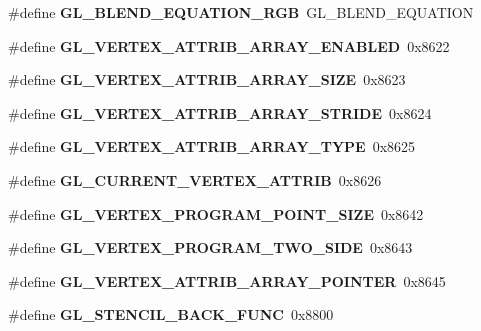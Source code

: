 \begin{DoxyCompactItemize}
\item 
\#define {\bfseries G\+L\+\_\+\+B\+L\+E\+N\+D\+\_\+\+E\+Q\+U\+A\+T\+I\+O\+N\+\_\+\+R\+G\+B}~G\+L\+\_\+\+B\+L\+E\+N\+D\+\_\+\+E\+Q\+U\+A\+T\+I\+O\+N\label{_s_d_l__opengl_8h_a2d24de280ec5f40a3c9e42f488ba0236}

\item 
\#define {\bfseries G\+L\+\_\+\+V\+E\+R\+T\+E\+X\+\_\+\+A\+T\+T\+R\+I\+B\+\_\+\+A\+R\+R\+A\+Y\+\_\+\+E\+N\+A\+B\+L\+E\+D}~0x8622\label{_s_d_l__opengl_8h_a5ec11ddfc4685d748eb5aa0f2ae6b8c7}

\item 
\#define {\bfseries G\+L\+\_\+\+V\+E\+R\+T\+E\+X\+\_\+\+A\+T\+T\+R\+I\+B\+\_\+\+A\+R\+R\+A\+Y\+\_\+\+S\+I\+Z\+E}~0x8623\label{_s_d_l__opengl_8h_a23a9e9e68af6b13075642a1353fd115f}

\item 
\#define {\bfseries G\+L\+\_\+\+V\+E\+R\+T\+E\+X\+\_\+\+A\+T\+T\+R\+I\+B\+\_\+\+A\+R\+R\+A\+Y\+\_\+\+S\+T\+R\+I\+D\+E}~0x8624\label{_s_d_l__opengl_8h_ad708be36b5d59b68ab7c9f19f9733881}

\item 
\#define {\bfseries G\+L\+\_\+\+V\+E\+R\+T\+E\+X\+\_\+\+A\+T\+T\+R\+I\+B\+\_\+\+A\+R\+R\+A\+Y\+\_\+\+T\+Y\+P\+E}~0x8625\label{_s_d_l__opengl_8h_a719a3174d4b848cbf2883d45803fbe30}

\item 
\#define {\bfseries G\+L\+\_\+\+C\+U\+R\+R\+E\+N\+T\+\_\+\+V\+E\+R\+T\+E\+X\+\_\+\+A\+T\+T\+R\+I\+B}~0x8626\label{_s_d_l__opengl_8h_a5bb317422e4b2f35eb0f54f625dfc49e}

\item 
\#define {\bfseries G\+L\+\_\+\+V\+E\+R\+T\+E\+X\+\_\+\+P\+R\+O\+G\+R\+A\+M\+\_\+\+P\+O\+I\+N\+T\+\_\+\+S\+I\+Z\+E}~0x8642\label{_s_d_l__opengl_8h_a7bfa8245cd2258d1b2ab510d2885d40a}

\item 
\#define {\bfseries G\+L\+\_\+\+V\+E\+R\+T\+E\+X\+\_\+\+P\+R\+O\+G\+R\+A\+M\+\_\+\+T\+W\+O\+\_\+\+S\+I\+D\+E}~0x8643\label{_s_d_l__opengl_8h_a849c1bb5fc1b42785834dd174a95b68d}

\item 
\#define {\bfseries G\+L\+\_\+\+V\+E\+R\+T\+E\+X\+\_\+\+A\+T\+T\+R\+I\+B\+\_\+\+A\+R\+R\+A\+Y\+\_\+\+P\+O\+I\+N\+T\+E\+R}~0x8645\label{_s_d_l__opengl_8h_a2d788006ebbb2cf18f4427626b9969f7}

\item 
\#define {\bfseries G\+L\+\_\+\+S\+T\+E\+N\+C\+I\+L\+\_\+\+B\+A\+C\+K\+\_\+\+F\+U\+N\+C}~0x8800\label{_s_d_l__opengl_8h_ab35a8ddee6d334f74fe61c43c4009740}


\end{DoxyCompactItemize}
